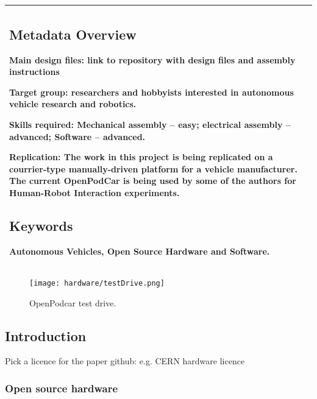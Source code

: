 \documentclass[a4paper]{article}
\begin{document}
\begin{longtable}[]{@{}l@{}}
\begin{minipage}[t]{0.97\columnwidth}\raggedright\strut


\subsection{Metadata Overview}\label{h.akaipbqoqfs8}

Main design files: link to repository with design files and assembly instructions

Target group: researchers and hobbyists interested in autonomous vehicle research and robotics. 

Skills required: Mechanical assembly – easy; electrical assembly – advanced; Software – advanced.

Replication: The work in this project is being replicated on a courrier-type manually-driven platform for a vehicle manufacturer. The current OpenPodCar is being used by some of the authors for Human-Robot Interaction experiments.



\subsection{Keywords}\label{h.kdz351yp7g7c}

{Autonomous Vehicles, Open Source Hardware and Software.}

\strut\end{minipage}\tabularnewline
\bottomrule
\end{longtable}

\begin{figure}[h]
	\texttt{[image: hardware/testDrive.png]}
	\caption{OpenPodcar test drive.}
	\label{fig:testDrive}
\end{figure}


\subsection{Introduction}\label{h.pnj38xyr5dyy}


Pick a licence for the paper github: e.g. CERN hardware licence

\subsubsection{Open source hardware}
\end{document}

